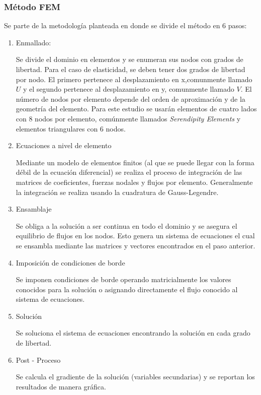 		\subsubsection{Método FEM}
		Se parte de la metodología planteada en \parencite{Reddy} donde se divide el método en 6 pasos:
			\begin{enumerate}
				\item Enmallado:

				Se divide el dominio en elementos y se enumeran sus nodos con grados de libertad. Para el caso de elasticidad, se deben tener dos grados de libertad por nodo. El primero pertenece al desplazamiento en x,comunmente llamado $U$ y el segundo pertenece al desplazamiento en y, comunmente llamado $V$. El número de nodos por elemento depende del orden de aproximación y de la geometría del elemento. Para este estudio se usarán elementos de cuatro lados con 8 nodos por elemento, comúnmente llamados \textit{Serendipity Elements} y elementos triangulares con 6 nodos.
				\item Ecuaciones a nivel de elemento

				Mediante un modelo de elementos finitos (al que se puede llegar con la forma débil de la ecuación diferencial) se realiza el proceso de integración de las matrices de coeficientes, fuerzas nodales y flujos por elemento. Generalmente la integración se realiza usando la cuadratura de Gauss-Legendre.
				\item Ensamblaje

				Se obliga a la solución a ser continua en todo el dominio y se asegura el equilibrio de flujos en los nodos. Esto genera un sistema de ecuaciones el cual se ensambla mediante las matrices y vectores encontrados en el paso anterior. 
				\item Imposición de condiciones de borde

				Se imponen condiciones de borde operando matricialmente los valores conocidos para la solución o asignando directamente el flujo conocido al sistema de ecuaciones. 
				\item Solución

				Se soluciona el sistema de ecuaciones encontrando la solución en cada grado de libertad.
				\item Post - Proceso

				Se calcula el gradiente de la solución (variables secundarias) y se reportan los resultados de manera gráfica.

			\end{enumerate}
